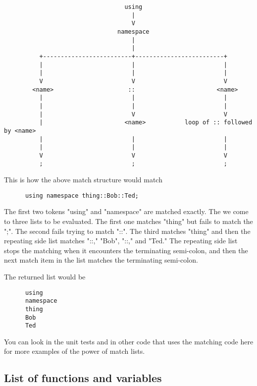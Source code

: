 \small{\begin{verbatim}
                                  using
                                    |
                                    V
                                namespace
                                    |
                                    |
          +-------------------------+-------------------------+
          |                         |                         |
          |                         |                         |
          V                         V                         V
        <name>                     ::                       <name>
          |                         |                         |
          |                         |                         |
          |                         V                         V
          |                       <name>           loop of :: followed by <name>
          |                         |                         |
          |                         |                         |
          V                         V                         V
          ;                         ;                         ;
\end{verbatim}}

This is how the above match structure would match

\small{\begin{verbatim}
      using namespace thing::Bob::Ted;
\end{verbatim}}

The first two tokens "using" and "namespace" are matched exactly.  The we
come to three lists to be evaluated.  The first one matches "thing" but fails
to match the ";".  The second fails trying to match "::".  The third matches
"thing" and then the repeating side list matches "::," "Bob", "::," and
"Ted."  The repeating side list stops the matching when it encounters the
terminating semi-colon, and then the next match item in the list matches the
terminating semi-colon.

The returned list would be

\small{\begin{verbatim}
      using
      namespace
      thing
      Bob
      Ted
\end{verbatim}}

You can look in the unit tests and in other code that uses the matching code
here for more examples of the power of match lists.



\subsection{List of functions and variables}

